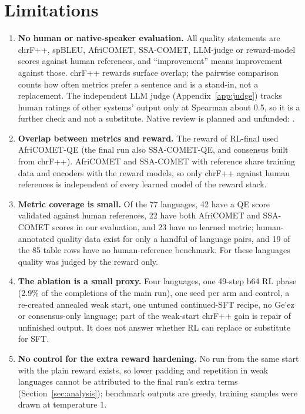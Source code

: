 \section{Limitations}\label{sec:limits}
\begin{enumerate}[label=\arabic*.]
\item \textbf{No human or native-speaker evaluation.} All quality statements are chrF++, spBLEU, AfriCOMET, SSA-COMET, LLM-judge or reward-model scores against human references, and ``improvement'' means improvement against those. chrF++ rewards surface overlap; the pairwise comparison counts how often metrics prefer a sentence and is a stand-in, not a replacement. The independent LLM judge (Appendix~\ref{app:judge}) tracks human ratings of other systems' output only at Spearman about 0.5, so it is a further check and not a substitute. Native review is planned and unfunded: .
\item \textbf{Overlap between metrics and reward.} The reward of RL-final used AfriCOMET-QE (the final run also SSA-COMET-QE, and consensus built from chrF++). AfriCOMET and SSA-COMET with reference share training data and encoders with the reward models, so only chrF++ against human references is independent of every learned model of the reward stack.
\item \textbf{Metric coverage is small.} Of the 77 languages, 42 have a QE score validated against human references, 22 have both AfriCOMET and SSA-COMET scores in our evaluation, and 23 have no learned metric; human-annotated quality data exist for only a handful of language pairs, and 19 of the 85 table rows have no human-reference benchmark. For these languages quality was judged by the reward only.
\item \textbf{The ablation is a small proxy.} Four languages, one 49-step b64 RL phase (2.9\% of the completions of the main run), one seed per arm and control, a re-created annealed weak start, one untuned continued-SFT recipe, no Ge'ez or consensus-only language; part of the weak-start chrF++ gain is repair of unfinished output. It does not answer whether RL can replace or substitute for SFT.
\item \textbf{No control for the extra reward hardening.} No run from the same start with the plain reward exists, so lower padding and repetition in weak languages cannot be attributed to the final run's extra terms (Section~\ref{sec:analysis}); benchmark outputs are greedy, training samples were drawn at temperature 1.

\end{enumerate}
